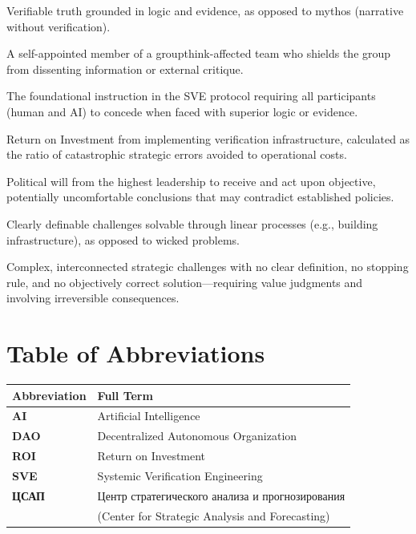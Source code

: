 \documentclass[11pt,a4paper]{article}
\begin{document}
\begin{small}
\begin{description}[style=nextline, leftmargin=0pt, labelindent=0pt, font=\normalfont\bfseries]
    \item[Logos] Verifiable truth grounded in logic and evidence, as opposed to mythos (narrative without verification).
    
    \item[Mindguard] A self-appointed member of a groupthink-affected team who shields the group from dissenting information or external critique.
    
    \item[Prime Directive] The foundational instruction in the SVE protocol requiring all participants (human and AI) to concede when faced with superior logic or evidence.
    
    \item[ROI of Truth] Return on Investment from implementing verification infrastructure, calculated as the ratio of catastrophic strategic errors avoided to operational costs.
    
    \item[Sanction for Truth] Political will from the highest leadership to receive and act upon objective, potentially uncomfortable conclusions that may contradict established policies.
    
    \item[Tame Problems] Clearly definable challenges solvable through linear processes (e.g., building infrastructure), as opposed to wicked problems.
    
    \item[Wicked Problems] Complex, interconnected strategic challenges with no clear definition, no stopping rule, and no objectively correct solution—requiring value judgments and involving irreversible consequences.
\end{description}

\section*{Table of Abbreviations}

\begin{tabular}{@{}>{\bfseries}ll@{}}
\toprule
\normalfont\textbf{Abbreviation} & \textbf{Full Term} \\
\midrule
AI & Artificial Intelligence \\
DAO & Decentralized Autonomous Organization \\
ROI & Return on Investment \\
SVE & Systemic Verification Engineering \\
ЦСАП & Центр стратегического анализа и прогнозирования \\
& (Center for Strategic Analysis and Forecasting) \\
\bottomrule
\end{tabular}


\end{small}
\end{document}

